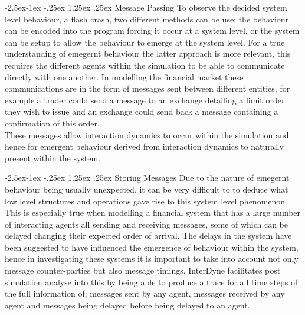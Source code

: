 \documentclass{article}
\makeatletter
\renewcommand\paragraph{\@startsection{paragraph}{4}{\z@}%
	{-2.5ex\@plus -1ex \@minus -.25ex}%
	{1.25ex \@plus .25ex}%
	{\normalfont\normalsize\bfseries}}
\makeatother
\begin{document}
\paragraph{Message Passing}
To observe the decided system level behaviour, a flash crash, two different methods can be use; the behaviour can be encoded into the program forcing it occur at a system level, or the system can be setup to allow the behaviour to emerge at the system level. For a true understanding of emegernt behaviour the latter approach is more relevant, this requires the different agents within the simulation to be able to communicate directly with one another. In modelling the financial market these communications are in the form of messages sent between different entities, for example a trader could send a message to an exchange detailing a limit order they wish to issue and an exchange could send back a message containing a confirmation of this order.\\
These messages allow interaction dynamics to occur within the simulation and hence for emergent behaviour derived from interaction dynamics to naturally present within the system. 




\paragraph{Storing Messages}
Due to the nature of emegernt behaviour being usually unexpected, it can be very difficult to to deduce what low level structures and operations gave rise to this system level phenomenon. This is especially true when modelling a financial system that has a large number of interacting agents all sending and receiving messages, some of which can be delayed changing their expected order of arrival. The delays in the system have been suggested to have influenced the emergence of behaviour within the system, hence in investigating these systems it is important to take into account not only message counter-parties but also message timings. InterDyne facilitates post simulation analyse into this by being able to produce a trace for all time steps of the full information of; messages sent by any agent, messages received by any agent and messages being delayed before being delayed to an agent.          

  
\end{document}
